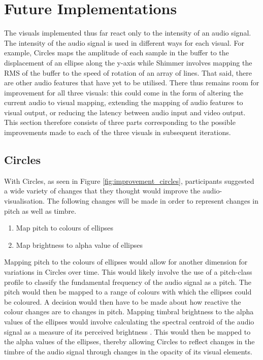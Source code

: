 \documentclass[../initial_thesis.tex]{subfiles}
\begin{document}
\section{Future Implementations}
The visuals implemented thus far react only to the intensity of an audio signal. The intensity of the audio signal is used in different ways for each visual. For example, Circles maps the amplitude of each sample in the buffer to the displacement of an ellipse along the y-axis while Shimmer involves mapping the RMS of the buffer to the speed of rotation of an array of lines. That said, there are other audio features that have yet to be utilised. There thus remains room for improvement for all three visuals: this could come in the form of altering the current audio to visual mapping, extending the mapping of audio features to visual output, or reducing the latency between audio input and video output. This section therefore consists of three parts corresponding to the possible improvements made to each of the three visuals in subsequent iterations.

\subsection{Circles}
With Circles, as seen in Figure \ref{fig:improvement_circles}, participants suggested a wide variety of changes that they thought would improve the audio-visualisation. The following changes will be made in order to represent changes in pitch as well as timbre.

\begin{enumerate}
\item {Map pitch to colours of ellipses}
\item {Map brightness to alpha value of ellipses}
\end{enumerate}

Mapping pitch to the colours of ellipses would allow for another dimension for variations in Circles over time. This would likely involve the use of a pitch-class profile to classify the fundamental frequency of the audio signal as a pitch. The pitch would then be mapped to a range of colours with which the ellipses could be coloured. A decision would then have to be made about how reactive the colour changes are to changes in pitch. Mapping timbral brightness to the alpha values of the ellipses would involve calculating the spectral centroid of the audio signal as a measure of its perceived brightness \cite{Schubert}. This would then be mapped to the alpha values of the ellipses, thereby allowing Circles to reflect changes in the timbre of the audio signal through changes in the opacity of its visual elements.
\end{document}
